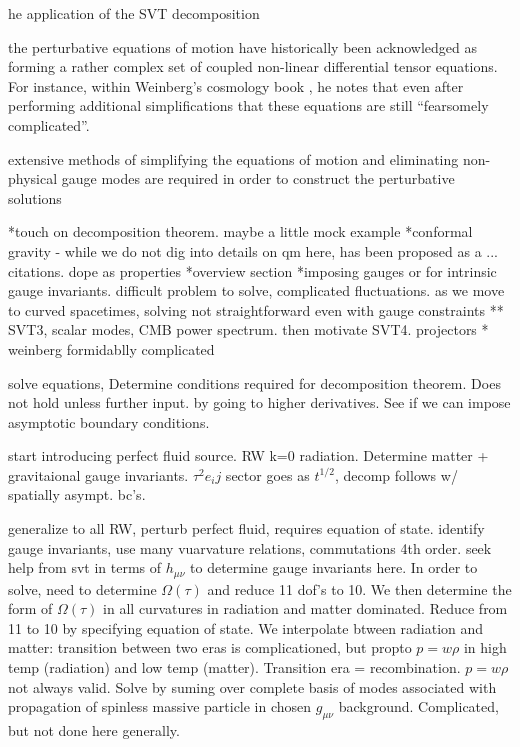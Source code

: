 	he application of the SVT decomposition 


the perturbative equations of motion have historically been acknowledged as forming a rather complex set of coupled non-linear differential tensor equations. For instance, within Weinberg's cosmology book \cite{weinberg_2008}, he notes that even after performing additional simplifications that these equations are still ``fearsomely complicated''. 






extensive methods of simplifying the equations of motion and eliminating non-physical gauge modes are required in order to construct the perturbative solutions


*touch on decomposition theorem. maybe a little mock example
*conformal gravity - while we do not dig into details on qm here, has been proposed as a ... citations. dope as properties
*overview section
*imposing gauges or for intrinsic gauge invariants. difficult problem to solve, complicated fluctuations. as we move to curved spacetimes, solving not straightforward even with gauge constraints
** SVT3, scalar modes, CMB power spectrum. then motivate SVT4. projectors
* weinberg formidablly complicated


solve equations, Determine conditions required for decomposition theorem. Does not hold unless further input. by going to higher derivatives. See if we can impose asymptotic boundary conditions. 

start introducing perfect fluid source. RW k=0 radiation. Determine matter + gravitaional gauge invariants. $\tau^2 e_ij$ sector goes as $t^{1/2}$, decomp follows w/ spatially asympt. bc's.

generalize to all RW, perturb perfect fluid, requires equation of state. identify gauge invariants, use many vuarvature relations, commutations 4th order. seek help from svt in terms of $h_{\mu\nu}$ to determine gauge invariants here. In order to solve, need to determine $\Omega(\tau)$ and reduce 11 dof's to 10. We then determine the form of $\Omega(\tau)$ in all curvatures in radiation and matter dominated. Reduce from 11 to 10 by specifying equation of state. We interpolate btween radiation and matter: transition between two eras is complicationed, but propto $p=w\rho$ in high temp (radiation) and low temp (matter). Transition era = recombination. $p=w\rho$ not always valid. Solve by suming over complete basis of modes associated with propagation of spinless massive particle in chosen $g_{\mu\nu}$ background. Complicated, but not done here generally. 

